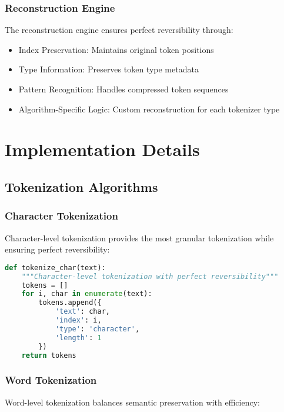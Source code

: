 \documentclass[conference]{IEEEtran}
\begin{document}
\subsubsection{Reconstruction Engine}

The reconstruction engine ensures perfect reversibility through:

\begin{itemize}
    \item Index Preservation: Maintains original token positions
    \item Type Information: Preserves token type metadata
    \item Pattern Recognition: Handles compressed token sequences
    \item Algorithm-Specific Logic: Custom reconstruction for each tokenizer type
\end{itemize}

\section{Implementation Details}

\subsection{Tokenization Algorithms}

\subsubsection{Character Tokenization}

Character-level tokenization provides the most granular tokenization while ensuring perfect reversibility:

\begin{lstlisting}[language=Python, caption=Character Tokenization Algorithm]
def tokenize_char(text):
    """Character-level tokenization with perfect reversibility"""
    tokens = []
    for i, char in enumerate(text):
        tokens.append({
            'text': char,
            'index': i,
            'type': 'character',
            'length': 1
        })
    return tokens
\end{lstlisting}

\subsubsection{Word Tokenization}

Word-level tokenization balances semantic preservation with efficiency:
\end{document}
